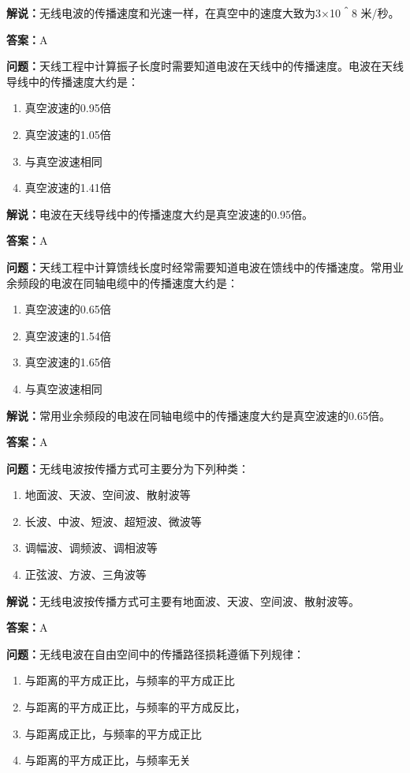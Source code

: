\textbf{解说：}无线电波的传播速度和光速一样，在真空中的速度大致为3×10＾8 米/秒。%

\textbf{答案：}A

\textbf{问题：}天线工程中计算振子长度时需要知道电波在天线中的传播速度。电波在天线导线中的传播速度大约是：

\begin{enumerate}[label=\Alph*), leftmargin=3em]
	\item 真空波速的0.95倍
	\item 真空波速的1.05倍
	\item 与真空波速相同
	\item 真空波速的1.41倍
\end{enumerate}

\textbf{解说：}电波在天线导线中的传播速度大约是真空波速的0.95倍。%

\textbf{答案：}A

\textbf{问题：}天线工程中计算馈线长度时经常需要知道电波在馈线中的传播速度。常用业余频段的电波在同轴电缆中的传播速度大约是：

\begin{enumerate}[label=\Alph*), leftmargin=3em]
	\item 真空波速的0.65倍
	\item 真空波速的1.54倍
	\item 真空波速的1.65倍
	\item 与真空波速相同
\end{enumerate}

\textbf{解说：}常用业余频段的电波在同轴电缆中的传播速度大约是真空波速的0.65倍。%

\textbf{答案：}A

\textbf{问题：}无线电波按传播方式可主要分为下列种类：

\begin{enumerate}[label=\Alph*), leftmargin=3em]
	\item 地面波、天波、空间波、散射波等
	\item 长波、中波、短波、超短波、微波等
	\item 调幅波、调频波、调相波等
	\item 正弦波、方波、三角波等
\end{enumerate}

\textbf{解说：}无线电波按传播方式可主要有地面波、天波、空间波、散射波等。%

\textbf{答案：}A

\textbf{问题：}无线电波在自由空间中的传播路径损耗遵循下列规律：

\begin{enumerate}[label=\Alph*), leftmargin=3em]
	\item 与距离的平方成正比，与频率的平方成正比
	\item 与距离的平方成正比，与频率的平方成反比，
	\item 与距离成正比，与频率的平方成正比
	\item 与距离的平方成正比，与频率无关
\end{enumerate}


